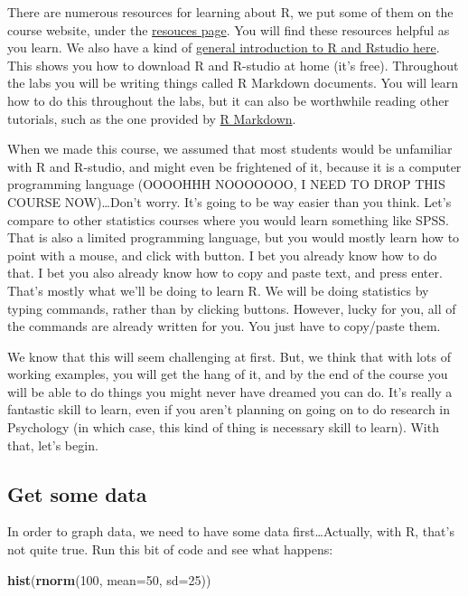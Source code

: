 \documentclass[
]{book}
\newenvironment{Shaded}{\begin{snugshade}}{\end{snugshade}}
\newcommand{\AttributeTok}[1]{\textcolor[rgb]{0.13,0.29,0.53}{#1}}
\newcommand{\DecValTok}[1]{\textcolor[rgb]{0.00,0.00,0.81}{#1}}
\newcommand{\FunctionTok}[1]{\textcolor[rgb]{0.13,0.29,0.53}{\textbf{#1}}}
\newcommand{\NormalTok}[1]{#1}
\begin{document}
There are numerous resources for learning about R, we put some of them on the course website, under the \href{https://crumplab.github.io/psyc3400/Resources.html}{resouces page}. You will find these resources helpful as you learn. We also have a kind of \href{https://crumplab.github.io/statisticsLab/software.html\#r}{general introduction to R and Rstudio here}. This shows you how to download R and R-studio at home (it's free). Throughout the labs you will be writing things called R Markdown documents. You will learn how to do this throughout the labs, but it can also be worthwhile reading other tutorials, such as the one provided by \href{https://rmarkdown.rstudio.com/lesson-1.html}{R Markdown}.

When we made this course, we assumed that most students would be unfamiliar with R and R-studio, and might even be frightened of it, because it is a computer programming language (OOOOHHH NOOOOOOO, I NEED TO DROP THIS COURSE NOW)\ldots Don't worry. It's going to be way easier than you think. Let's compare to other statistics courses where you would learn something like SPSS. That is also a limited programming language, but you would mostly learn how to point with a mouse, and click with button. I bet you already know how to do that. I bet you also already know how to copy and paste text, and press enter. That's mostly what we'll be doing to learn R. We will be doing statistics by typing commands, rather than by clicking buttons. However, lucky for you, all of the commands are already written for you. You just have to copy/paste them.

We know that this will seem challenging at first. But, we think that with lots of working examples, you will get the hang of it, and by the end of the course you will be able to do things you might never have dreamed you can do. It's really a fantastic skill to learn, even if you aren't planning on going on to do research in Psychology (in which case, this kind of thing is necessary skill to learn). With that, let's begin.

\hypertarget{get-some-data}{%
\subsection{Get some data}\label{get-some-data}}

In order to graph data, we need to have some data first\ldots Actually, with R, that's not quite true. Run this bit of code and see what happens:

\begin{Shaded}
\begin{Highlighting}[]
\FunctionTok{hist}\NormalTok{(}\FunctionTok{rnorm}\NormalTok{(}\DecValTok{100}\NormalTok{, }\AttributeTok{mean=}\DecValTok{50}\NormalTok{, }\AttributeTok{sd=}\DecValTok{25}\NormalTok{))}
\end{Highlighting}
\end{Shaded}
\end{document}
